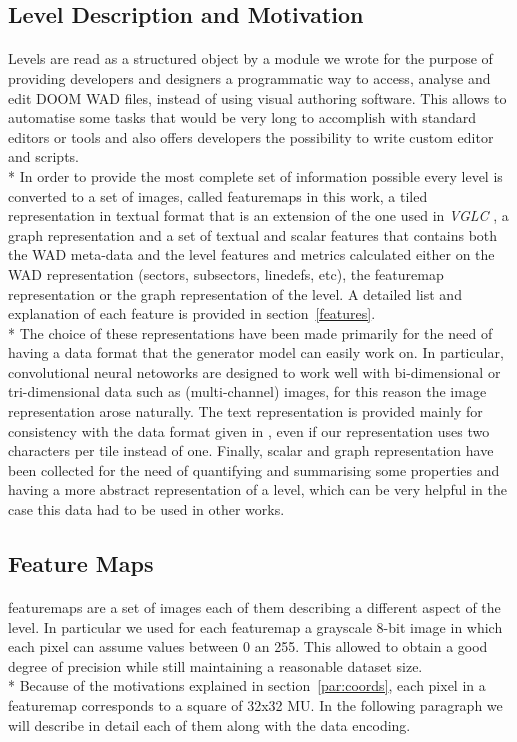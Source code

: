 \subsection{Level Description and Motivation}
\paragraph{}Levels are read as a structured object by a module we wrote for the purpose of providing developers and designers a programmatic way to access, analyse and edit DOOM WAD files, instead of using visual authoring software. This allows to automatise some tasks that would be very long to accomplish with standard editors or tools and also offers developers the possibility to write custom editor and scripts. \\*
In order to provide the most complete set of information possible every level is converted to a set of images, called \glspl{featuremap} in this work, a tiled representation in textual format that is an extension of the one used in \textit{VGLC} \cite{VGLC}, a graph representation and a set of textual and scalar features that contains both the \gls{WAD} meta-data and the level features and metrics calculated either on the WAD representation (sectors, subsectors, linedefs, etc), the \gls{featuremap} representation or the graph representation of the level. A detailed list and explanation of each feature is provided in section~\ref{features}. \\*
The choice of these representations have been made primarily for the need of having a data format that the generator model can easily work on. In particular, convolutional neural netoworks are designed to work well with bi-dimensional or tri-dimensional data such as (multi-channel) images, for this reason the image representation arose naturally. The text representation is provided mainly for consistency with the data format given in \cite{VGLC}, even if our representation uses two characters per tile instead of one. Finally, scalar and graph representation have been collected for the need of quantifying and summarising some properties and having a more abstract representation of a level, which can be very helpful in the case this data had to be used in other works.

\subsection{Feature Maps}
\paragraph{} \glspl{featuremap} are a set of images each of them describing a different aspect of the level. In particular we used for each \gls{featuremap} a grayscale 8-bit image in which each pixel can assume values between 0 an 255. This allowed to obtain a good degree of precision while still maintaining a reasonable dataset size. \\*
Because of the motivations explained in section~\ref{par:coords}, each pixel in a \gls{featuremap} corresponds to a square of 32x32 \gls{MU}. 
In the following paragraph we will describe in detail each of them along with the data encoding.

